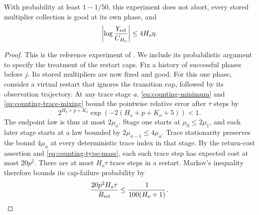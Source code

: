\begin{proposition}
\label{prop:counting-reference}
With probability at least $1-1/50$, this experiment does not abort,
every stored multiplier collection is good at its own phase, and
\begin{equation}
 \left|\log\frac{Y_{\rm ref}}{C_{H_o}}\right|\leq4H_o\eta.
 \label{eq:counting-reference-error}
\end{equation}
\end{proposition}

\begin{proof}
This is the reference experiment of \cite[Section~7.2 and
Proposition~7.2]{CB}.  We include its probabilistic argument to specify
the treatment of the restart caps.  Fix a history of successful phases
before $j$.  Its stored multipliers are now fixed and good.  For this
one phase, consider a virtual restart that ignores the transition cap,
followed by its observation trajectory.  At any trace stage $a$,
\eqref{eq:counting-minimum} and \eqref{eq:counting-trace-mixing} bound
the pointwise relative error after $\tau$ steps by
\[
 2^{H_o+p+K_o}\exp(-2(H_o+p+K_o+5))<1.
\]
The endpoint law is thus at most $2\mu_a$.  Stage one starts at
$\mu_0\leq2\mu_1$, and each later stage starts at a law bounded
by $2\mu_{a-1}\leq4\mu_a$.  Trace stationarity preserves the bound
$4\mu_a$ at every deterministic trace index in that stage.
By the return-cost assertion and \eqref{eq:counting-type-mass},
each such trace step has expected cost at most $20p^2$.
There are at most $H_o\tau$ trace steps in a restart.  Markov's
inequality therefore bounds its cap-failure probability by
\begin{equation}
 \frac{20p^2H_o\tau}{B_{\rm ret}}
       \leq\frac1{100(H_o+1)}.
 \label{eq:counting-cap-error}
\end{equation}


\end{proof}
